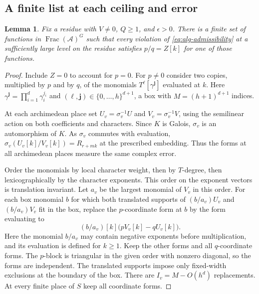 \documentclass[11pt,a4paper,reqno]{amsart}
\newtheorem{lemma}[theorem]{Lemma}
\theoremstyle{definition}
\theoremstyle{remark}
\numberwithin{equation}{section}
\begin{document}
\subsection{A finite list at each ceiling and error}

\begin{lemma}\label{lem:alg-finite}
Fix a residue with \(V\ne0\), \(Q\ge1\), and \(\epsilon>0\).
There is a finite set of functions in
\(\operatorname{Frac}(\mathcal A)^G\) such that every violation of
\eqref{eq:alg-admissibility} at a sufficiently large level on the
residue satisfies \(p/q=Z[k]\) for one of those functions.
\end{lemma}

\begin{proof}
Include \(Z=0\) to account for \(p=0\). For \(p\ne0\) consider two
copies, multiplied by \(p\) and by \(q\), of the monomials
\(T^\ell[\gamma^{\mathbf j}]\) evaluated at \(k\). Here
\(\gamma^{\mathbf j}=\prod_{i=1}^d\gamma_i^{j_i}\) and
\((\ell,\mathbf j)\in\{0,\ldots,h\}^{d+1}\), a box with
\(M=(h+1)^{d+1}\) indices.

At each archimedean place set
\(U_v=\sigma_v^{-1}U\) and \(V_v=\sigma_v^{-1}V\), using the
semilinear action on both coefficients and characters.
Since \(K\) is Galois, \(\sigma_v\) is an automorphism of \(K\).
As \(\sigma_v\) commutes with evaluation,
\(\sigma_v(U_v[k]/V_v[k])=R_{r+mk}\) at the prescribed embedding.
Thus the forms at all archimedean places measure the same complex
error.

Order the monomials by local character weight, then by \(T\)-degree,
then lexicographically by the character exponents. This order on
the exponent vectors is translation invariant. Let \(a_v\) be the
largest monomial of \(V_v\) in this order. For each box monomial \(b\)
for which both translated supports of \((b/a_v)U_v\) and
\((b/a_v)V_v\) fit in the box, replace the \(p\)-coordinate form at
\(b\) by the form evaluating to
\[
 (b/a_v)[k]\bigl(p V_v[k]-q U_v[k]\bigr).
\]
Here the monomial \(b/a_v\) may contain negative exponents before
multiplication, and its evaluation is defined for \(k\ge1\).
Keep the other forms and all \(q\)-coordinate forms. The
\(p\)-block is triangular in the given order with nonzero diagonal,
so the forms are independent. The translated supports impose only
fixed-width exclusions at the boundary of the box. There are
\(I_v=M-O(h^d)\) replacements. At every finite place of \(S\) keep
all coordinate forms.


\end{proof}
\end{document}
